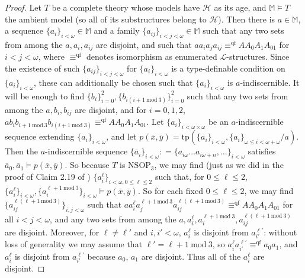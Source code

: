 \documentclass{amsart}
\theoremstyle{definition}
\theoremstyle{remark}
\numberwithin{equation}{section}
\begin{document}
\begin{proof}
    Let $T$ be a complete theory whose models have $\mathcal{H}$ as its age, and $\mathbb{M} \models T$ the ambient model (so all of its substructures belong to $\mathcal{H}$). Then there is $a \in \mathbb{M}$, a sequence $\{a_{i}\}_{i< \omega} \in \mathbb{M}$ and a family $\{a_{ij}\}_{i < j< \omega} \in \mathbb{M}$ such that any two sets from among the $a, a_i, a_{ij}$ are disjoint, and such that $aa_ia_ja_{ij} \equiv^{\mathrm{qf}} A A_{0}A_{1}A_{01}$ for $i < j < \omega$, where $\equiv^{\mathrm{qf}}$ denotes isomorphism as enumerated $\mathcal{L}$-structures. Since the existence of such $\{a_{ij}\}_{i < j< \omega}$ for $\{a_{i}\}_{i< \omega}$ is a type-definable condition on $\{a_{i}\}_{i< \omega}$, these can additionally be chosen such that $\{a_{i}\}_{i< \omega}$ is $a$-indiscernible. It will be enough to find $ \{b_i\}^{2}_{i =0}, \{b_{i(i+1\mathrm{\:mod\:} 3)}\}^{2}_{i=0}$ such that any two sets from among the $a, b_i, b_{ij}$ are disjoint, and for $i =0, 1, 2$,  $ab_{i} b_{i+1 \mathrm{\: mod \:} 3}b_{i(i+1\mathrm{\:mod\:} 3)}  \equiv^{\mathrm{qf}} AA_0A_1A_{01}$. Let $\{a_i\}_{i < \omega\times\omega}$ be an $a$-indiscernible sequence extending $\{a_{i}\}_{i< \omega}$, and let $p(\overline{x}, \overline{y})=\mathrm{tp}(\{a_i\}_{i< \omega}, \{a_i\}_{\omega\leq i < \omega+\omega}/a)$. Then the $a$-indiscernible sequence $\{\overline{a}_{i}\}_{i < \omega} : = \{a_{i \omega} \ldots a_{i\omega + n}, \ldots\}_{i < \omega}$ satisfies $\overline{a}_{0}, \overline{a}_1\models p(\overline{x}, \overline{y})$. So because $T$ is $\mathrm{NSOP}_{3}$, we may find (just as we did in the proof of Claim 2.19 of \cite{ApproxOrder}) $\{a^\ell_i\}_{i < \omega, 0 \leq \ell \leq 2}$ such that, for $0 \leq \ell \leq 2$, $\{a^\ell_i\}_{i < \omega} , \{a^{\ell+1 \mathrm{\: mod \:}3}_i\}_{i < \omega} \models p(\overline{x}, \overline{y})$. So for each fixed $0 \leq \ell \leq 2$, we may find $\{a^{\ell (\ell+1 \mathrm{\: mod\: } 3)}_{ij}\}_{i,j < \omega}$  such that $a a^{\ell}_i a_{j}^{\ell+1 \mathrm{\:mod\:}3} a^{\ell (\ell+1 \mathrm{\: mod\: } 3)}_{ij}\equiv^{\mathrm{qf}} AA_0A_1A_{01}$ for all $i < j < \omega$, and any two sets from among the $a, a^{\ell}_i, a^{\ell+1 \mathrm{\: mod \:}3}_{i},  a^{\ell (\ell+1 \mathrm{\: mod\: } 3)}_{ij}$ are disjoint. Moreover, for $\ell \neq \ell'$ and $i, i' < \omega$, $a^{\ell}_{i}$ is disjoint from $a^{\ell'}_{i'}$: without loss of generality we may assume that $\ell' = \ell + 1 \mathrm{\: mod \:} 3$, so $a^{\ell}_{i}a^{\ell'}_{i'} \equiv^{\mathrm{qf}}a_{0}a_{1}$, and $a^{\ell}_{i}$ is disjoint from $a^{\ell'}_{i'}$ because $a_{0}$, $a_{1}$ are disjoint. Thus all of the $a^{\ell}_{i}$ are disjoint.


\end{proof}
\end{document}
